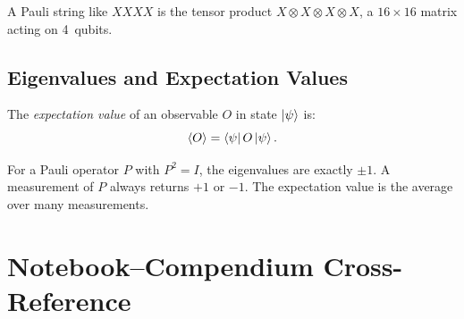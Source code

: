 \documentclass[11pt,a4paper,twoside]{report}
\theoremstyle{definition}
\newcommand{\expect}[1]{\langle #1 \rangle}
\begin{document}
A Pauli string like $XXXX$ is the tensor product $X \otimes X \otimes X
\otimes X$, a $16 \times 16$ matrix acting on 4~qubits.

\section{Eigenvalues and Expectation Values}

The \emph{expectation value} of an observable $O$ in state
$\ket{\psi}$ is:
\begin{equation}
  \expect{O} = \bra{\psi} O \ket{\psi}.
\end{equation}

For a Pauli operator $P$ with $P^2 = I$, the eigenvalues are exactly
$\pm 1$. A measurement of $P$ always returns $+1$ or $-1$. The
expectation value is the average over many measurements.

\chapter{Notebook--Compendium Cross-Reference}
\label{app:xref}
\end{document}
